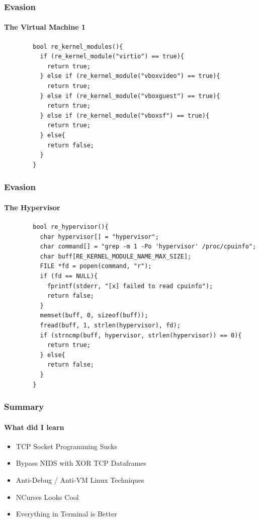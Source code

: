 \documentclass[aspectratio=169]{beamer}
\begin{document}
\begin{frame}[fragile]{}
  \frametitle{Evasion}
  \framesubtitle{The Virtual Machine 1}
  \begin{center}
    \begin{tcolorbox}[title=re.c,colback=black]
    \begin{minipage}{0.5\textwidth}
      \begin{verbatim}
        bool re_kernel_modules(){
          if (re_kernel_module("virtio") == true){
            return true;
          } else if (re_kernel_module("vboxvideo") == true){
            return true;
          } else if (re_kernel_module("vboxguest") == true){
            return true;
          } else if (re_kernel_module("vboxsf") == true){
            return true;
          } else{
            return false;
          }
        }
      \end{verbatim}
    \end{minipage}
    \end{tcolorbox}
  \end{center}
\end{frame}

\begin{frame}[fragile]{}
  \frametitle{Evasion}
  \framesubtitle{The Hypervisor}
  \begin{center}
    \begin{tcolorbox}[title=re.c,colback=black]
    \begin{minipage}{0.5\textwidth}
      \begin{verbatim}
        bool re_hypervisor(){
          char hypervisor[] = "hypervisor";
          char command[] = "grep -m 1 -Po 'hypervisor' /proc/cpuinfo";
          char buff[RE_KERNEL_MODULE_NAME_MAX_SIZE];
          FILE *fd = popen(command, "r");
          if (fd == NULL){
            fprintf(stderr, "[x] failed to read cpuinfo");
            return false;
          }
          memset(buff, 0, sizeof(buff));
          fread(buff, 1, strlen(hypervisor), fd);
          if (strncmp(buff, hypervisor, strlen(hypervisor)) == 0){
            return true;
          } else{
            return false;
          }
        }
      \end{verbatim}
    \end{minipage}
    \end{tcolorbox}
  \end{center}
\end{frame}

\begin{frame}
  \frametitle{Summary}
  \framesubtitle{What did I learn}
  \begin{itemize}
  \item{TCP Socket Programming Sucks}
  \item{Bypass NIDS with XOR TCP Dataframes}
  \item{Anti-Debug / Anti-VM Linux Techniques}
  \item{NCurses Looks Cool}
  \item{Everything in Terminal is Better}
  \end{itemize}
\end{frame}
\end{document}
